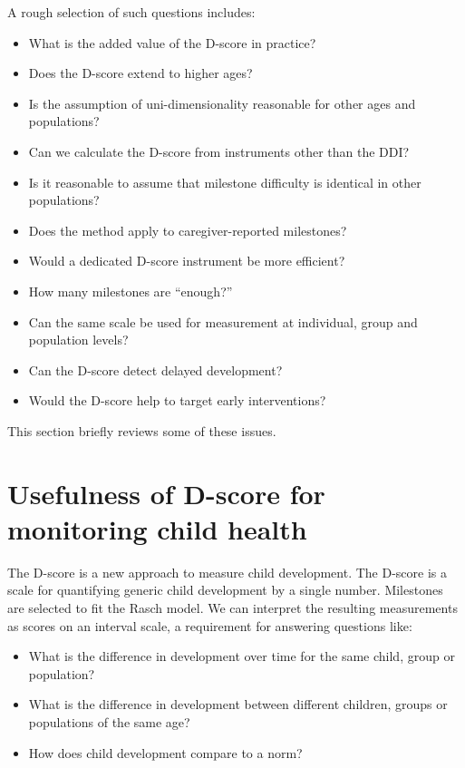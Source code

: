 \documentclass[
]{book}
\providecommand{\tightlist}{%
  \setlength{\itemsep}{0pt}\setlength{\parskip}{0pt}}
\begin{document}
A rough selection of such questions includes:

\begin{itemize}
\tightlist
\item
  What is the added value of the D-score in practice?
\item
  Does the D-score extend to higher ages?
\item
  Is the assumption of uni-dimensionality reasonable for other ages and populations?
\item
  Can we calculate the D-score from instruments other than the DDI?
\item
  Is it reasonable to assume that milestone difficulty is identical in other populations?
\item
  Does the method apply to caregiver-reported milestones?
\item
  Would a dedicated D-score instrument be more efficient?
\item
  How many milestones are ``enough?''
\item
  Can the same scale be used for measurement at individual, group and population levels?
\item
  Can the D-score detect delayed development?
\item
  Would the D-score help to target early interventions?
\end{itemize}

This section briefly reviews some of these issues.

\hypertarget{usefulness-of-d-score-for-monitoring-child-health}{%
\section{Usefulness of D-score for monitoring child health}\label{usefulness-of-d-score-for-monitoring-child-health}}

The D-score is a new approach to measure child development. The D-score is a scale for quantifying generic child development by a single number. Milestones are selected to fit the Rasch model. We can interpret the resulting measurements as scores on an interval scale, a requirement for answering questions like:

\begin{itemize}
\item
  What is the difference in development over time for the same child, group or population?
\item
  What is the difference in development between different children, groups or populations of the same age?
\item
  How does child development compare to a norm?
\end{itemize}
\end{document}
